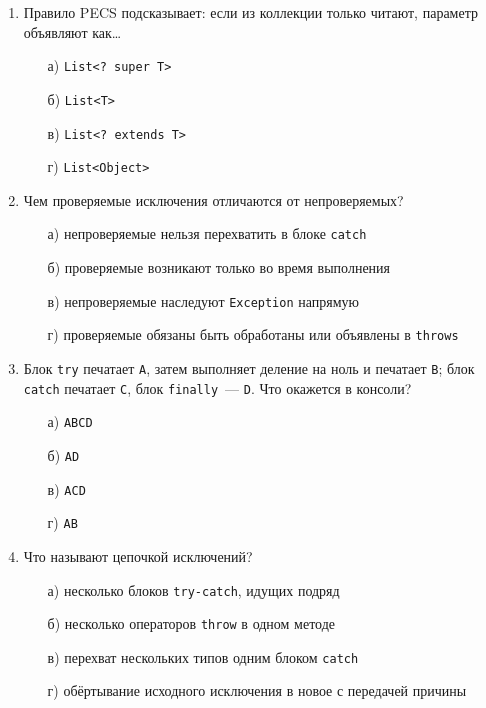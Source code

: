 \begin{enumerate}
\item Правило PECS подсказывает: если из коллекции только читают, параметр
      объявляют как\ldots
  \begin{enumerate}
    \item[а)] \texttt{List<? super T>}
    \item[б)] \texttt{List<T>}
    \item[в)] \texttt{List<? extends T>}
    \item[г)] \texttt{List<Object>}
  \end{enumerate}

\item Чем проверяемые исключения отличаются от непроверяемых?
  \begin{enumerate}
    \item[а)] непроверяемые нельзя перехватить в блоке \texttt{catch}
    \item[б)] проверяемые возникают только во время выполнения
    \item[в)] непроверяемые наследуют \texttt{Exception} напрямую
    \item[г)] проверяемые обязаны быть обработаны или объявлены в
              \texttt{throws}
  \end{enumerate}

\item Блок \texttt{try} печатает \texttt{A}, затем выполняет деление на ноль и
      печатает \texttt{B}; блок \texttt{catch} печатает \texttt{C}, блок
      \texttt{finally}~--- \texttt{D}. Что окажется в консоли?
  \begin{enumerate}
    \item[а)] \texttt{ABCD}
    \item[б)] \texttt{AD}
    \item[в)] \texttt{ACD}
    \item[г)] \texttt{AB}
  \end{enumerate}

\item Что называют цепочкой исключений?
  \begin{enumerate}
    \item[а)] несколько блоков \texttt{try-catch}, идущих подряд
    \item[б)] несколько операторов \texttt{throw} в одном методе
    \item[в)] перехват нескольких типов одним блоком \texttt{catch}
    \item[г)] обёртывание исходного исключения в новое с передачей причины
  \end{enumerate}


\end{enumerate}
